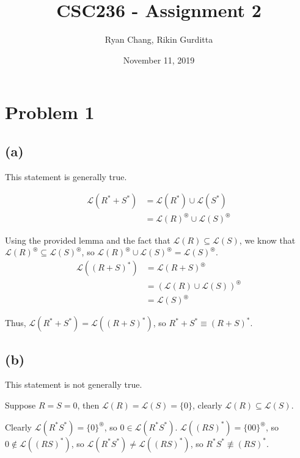 \documentclass[12pt]{article}
\title{CSC236 - Assignment 2}
\author{Ryan Chang, Rikin Gurditta}
\date{November 11, 2019}
\newcommand{\Lang}{\mathcal{L}}
\newcommand{\Kast}{^\circledast}
\begin{document}
\maketitle

\section*{Problem 1}
\subsection*{(a)}

This statement is generally true.

\begin{align*}
    \Lang(R^* + S^*) &= \Lang(R^*) \cup \Lang(S^*) \\
    &= \Lang(R)\Kast \cup \Lang(S)\Kast
\end{align*}

Using the provided lemma and the fact that $\Lang(R) \subseteq \Lang(S)$, we know that $\Lang(R)\Kast \subseteq \Lang(S)\Kast$, so $\Lang(R)\Kast \cup \Lang(S)\Kast = \Lang(S)\Kast$.
\begin{align*}
    \Lang((R + S)^*) &= \Lang(R + S)\Kast \\
    &= (\Lang(R) \cup \Lang(S))\Kast \\
    &= \Lang(S)\Kast
\end{align*}

Thus, $\Lang(R^* + S^*) = \Lang((R + S)^*)$, so $R^* + S^* \equiv (R + S)^*$.


\subsection*{(b)}
This statement is not generally true.

\hfill

Suppose $R = S = 0$, then $\Lang(R) = \Lang(S) = \{ 0 \}$, clearly $\Lang(R) \subseteq \Lang(S)$.

Clearly $\Lang(R^* S^*) = \{ 0 \}\Kast$, so $0 \in \Lang(R^* S^*)$. $\Lang((RS)^*) = \{ 00 \}\Kast$, so $0 \notin \Lang((RS)^*)$, so $\Lang(R^* S^*) \neq \Lang((RS)^*)$, so $R^* S^* \not \equiv (RS)^*$.


\newpage
\end{document}
